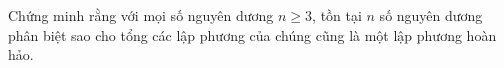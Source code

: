 \ifshowproblem
\begin{problem}\label{problem:BGR-2015-EGMO-TST-P6}
	Chứng minh rằng với mọi số nguyên dương \( n \geq 3 \),
	tồn tại \( n \) số nguyên dương phân biệt sao cho tổng các lập phương của chúng cũng là một lập phương hoàn hảo.
\end{problem}
\fi

\footnotemark
{}
\fi